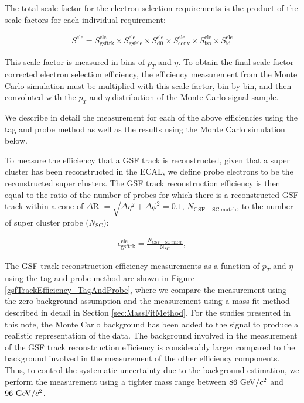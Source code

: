 \documentclass{cmspaper}
\begin{document}
The total scale factor for the electron selection requirements is the product of the scale factors for each individual requirement:

\begin{eqnarray}
  \label{eqn:electronTotalEfficiencyScaleFactor}
  S^{\mathrm{ele}} = S_{\mathrm{gsftrk}}^{\mathrm{ele}} \times S_{\mathrm{gsfele}}^{\mathrm{ele}} \times  S_{\mathrm{d0}}^{\mathrm{ele}} \times  S_{\mathrm{conv}}^{\mathrm{ele}}  \times S_{\mathrm{iso}}^{\mathrm{ele}}  \times S_{\mathrm{id}}^{\mathrm{ele}}
\end{eqnarray}

This scale factor is measured in bins of $p_{T}$ and $\eta$. To obtain the final scale factor corrected electron selection efficiency, the efficiency measurement from the Monte Carlo simulation must be multiplied with this scale factor, bin by bin, and then convoluted with the $p_{T}$ and $\eta$ distribution of the Monte Carlo signal sample. 

We describe in detail the measurement for each of the above efficiencies using the tag and probe method as well as the results using the Monte Carlo simulation below. 

To measure the efficiency that a GSF track is reconstructed, given that a super cluster has been reconstructed in the ECAL, we define probe electrons to be the reconstructed super clusters.  The GSF track reconstruction efficiency is then equal to the ratio of the number of probes for which there is a reconstructed GSF track within a cone of $\Delta$R $=\sqrt{\Delta\eta^{2}+\Delta\phi^{2}} = 0.1$, $N_{\mathrm{GSF-SC\ match}}$, to the number of super cluster probe ($N_{\mathrm{SC}}$):

\begin{eqnarray}
  \label{eqn:gsftrkEfficiency}  
  \epsilon_{\mathrm{gsftrk}}^{\mathrm{ele}} = \frac{N_{\mathrm{GSF-SC\ match}}}{\mathrm{N_{\mathrm{SC}}}},
\end{eqnarray}

The GSF track reconstruction efficiency measurements as a function of $p_{T}$ and $\eta$ using the tag and probe method are shown in Figure \ref{gsfTrackEfficiency_TagAndProbe}, where we compare the measurement using the zero background assumption and the measurement using a mass fit method described in detail in Section \ref{sec:MassFitMethod}. For the studies presented in this note, the Monte Carlo background has been added to the signal to produce a realistic representation of the data. The background involved in the measurement of the GSF track reconstruction efficiency is considerably larger compared to the background involved in the measurement of the other efficiency components. Thus, to control the systematic uncertainty due to the background estimation, we perform the measurement using a tighter mass range between $86\ \mathrm{Ge\kern -0.1em V/}c^2$ and $96\ \mathrm{Ge\kern -0.1em V/}c^2$.
\end{document}
